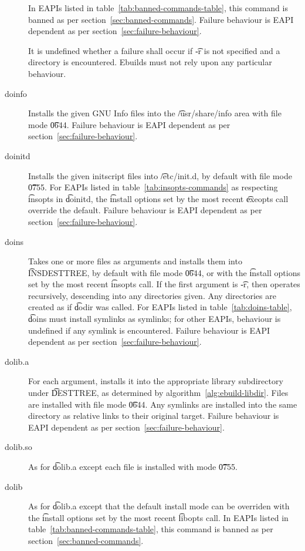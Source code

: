 \begin{description}
    In EAPIs listed in table~\ref{tab:banned-commands-table}, this command is banned as per
    section~\ref{sec:banned-commands}.
    Failure behaviour is EAPI dependent as per section~\ref{sec:failure-behaviour}.

    It is undefined whether a failure shall occur if \t{-r} is not specified and a directory is
    encountered. Ebuilds must not rely upon any particular behaviour.

\item[doinfo] Installs the given GNU Info files into the \t{/usr/share/info} area with file mode
    \t{0644}. Failure behaviour is EAPI dependent as per section~\ref{sec:failure-behaviour}.

\item[doinitd] Installs the given initscript files into \t{/etc/init.d}, by default with file mode
    \t{0755}. For EAPIs listed in table~\ref{tab:insopts-commands} as respecting \t{insopts}
    in \t{doinitd}, the \t{install} options set by the most recent \t{exeopts} call override
    the default. Failure behaviour is EAPI dependent as per section~\ref{sec:failure-behaviour}.

\item[doins]  Takes one or more files as arguments and installs them into
    \t{INSDESTTREE}, by default with file mode \t{0644}, or with the \t{install} options set by
    the most recent \t{insopts} call. If the first argument is \t{-r}, then operates recursively,
    descending into any directories given. Any directories are created as if \t{dodir} was called.
    For EAPIs listed in table~\ref{tab:doins-table}, \t{doins} must install symlinks as symlinks;
    for other EAPIs, behaviour is undefined if any symlink is encountered. Failure behaviour is
    EAPI dependent as per section~\ref{sec:failure-behaviour}.

\item[dolib.a] For each argument, installs it into the appropriate library subdirectory under
    \t{DESTTREE}, as determined by algorithm~\ref{alg:ebuild-libdir}. Files are installed with file
    mode \t{0644}. Any symlinks are installed into the same directory as relative links to their
    original target. Failure behaviour is EAPI dependent as per section~\ref{sec:failure-behaviour}.

\item[dolib.so] As for \t{dolib.a} except each file is installed with mode \t{0755}.

\item[dolib] As for \t{dolib.a} except that the default install mode can be overriden with
    the \t{install} options set by the most recent \t{libopts} call. In EAPIs listed
    in table~\ref{tab:banned-commands-table}, this command is banned as per
    section~\ref{sec:banned-commands}.


\end{description}

